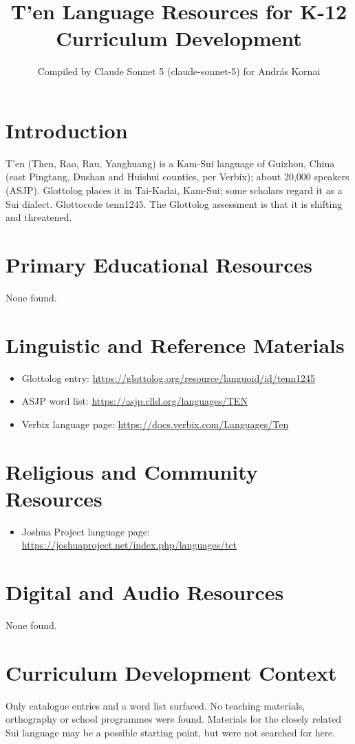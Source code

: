 \documentclass[12pt]{article}
\title{T’en Language Resources for K-12 Curriculum Development}
\author{Compiled by Claude Sonnet 5 (claude-sonnet-5) for Andr\'as Kornai}
\date{}
\begin{document}
\maketitle
\section{Introduction}
T’en (Then, Rao, Rau, Yanghuang) is a Kam-Sui language of Guizhou, China (east Pingtang, Dushan and Huishui counties, per Verbix); about 20,000 speakers (ASJP). Glottolog places it in Tai-Kadai, Kam-Sui; some scholars regard it as a Sui dialect. Glottocode tenn1245. The Glottolog assessment is that it is shifting and threatened.
\section{Primary Educational Resources}
None found.
\section{Linguistic and Reference Materials}
\begin{itemize}
\item Glottolog entry: \url{https://glottolog.org/resource/languoid/id/tenn1245}
\item ASJP word list: \url{https://asjp.clld.org/languages/TEN}
\item Verbix language page: \url{https://docs.verbix.com/Languages/Ten}
\end{itemize}
\section{Religious and Community Resources}
\begin{itemize}
\item Joshua Project language page: \url{https://joshuaproject.net/index.php/languages/tct}
\end{itemize}
\section{Digital and Audio Resources}
None found.
\section{Curriculum Development Context}
Only catalogue entries and a word list surfaced. No teaching materials, orthography or school programmes were found. Materials for the closely related Sui language may be a possible starting point, but were not searched for here.
\end{document}
